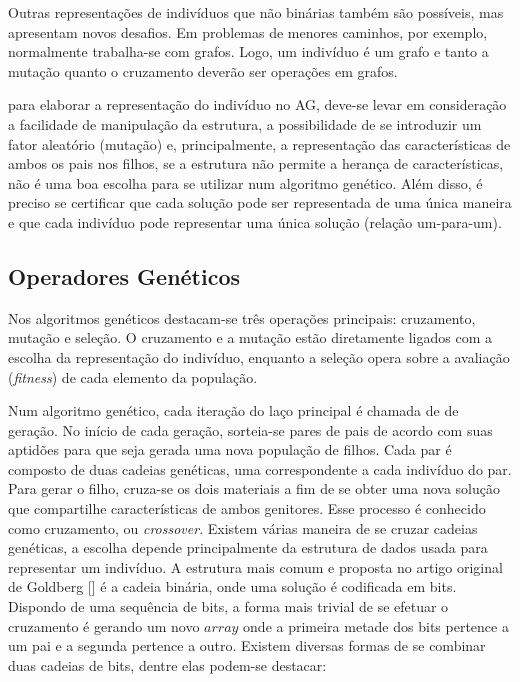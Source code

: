 Outras representações de indivíduos que não binárias também são possíveis, mas apresentam novos desafios. Em problemas de menores caminhos, por exemplo, normalmente trabalha-se com grafos. Logo, um indivíduo é um grafo e tanto a mutação quanto o cruzamento deverão ser operações em grafos.

para elaborar a representação do indivíduo no AG, deve-se levar em consideração a facilidade de manipulação da estrutura, a possibilidade de se introduzir um fator aleatório (mutação) e, principalmente, a representação das características de ambos os pais nos filhos, se a estrutura não permite a herança de características, não é uma boa escolha para se utilizar num algoritmo genético. Além disso, é preciso se certificar que cada solução pode ser representada de uma única maneira e que cada indivíduo pode representar uma única solução (relação um-para-um).

\subsection{Operadores Genéticos}
Nos algoritmos genéticos destacam-se três operações principais: cruzamento, mutação e seleção. O cruzamento e a mutação estão diretamente ligados com a escolha da representação do indivíduo, enquanto a seleção opera sobre a avaliação (\textit{fitness}) de cada elemento da população.

Num algoritmo genético, cada iteração do laço principal é chamada de de geração. No início de cada geração, sorteia-se pares de pais de acordo com suas aptidões para que seja gerada uma nova população de filhos. Cada par é composto de duas cadeias genéticas, uma correspondente a cada indivíduo do par. Para gerar o filho, cruza-se os dois materiais a fim de se obter uma nova solução que compartilhe características de ambos genitores. Esse processo é conhecido como cruzamento, ou \textit{crossover}. Existem várias maneira de se cruzar cadeias genéticas, a escolha depende principalmente da estrutura de dados usada para representar um indivíduo. A estrutura mais comum e proposta no artigo original de Goldberg [] é a cadeia binária, onde uma solução é codificada em bits. Dispondo de uma sequência de bits, a forma mais trivial de se efetuar o cruzamento é gerando um novo $array$ onde a primeira metade dos bits pertence a um pai e a segunda pertence a outro. Existem diversas formas de se combinar duas cadeias de bits, dentre elas podem-se destacar:

